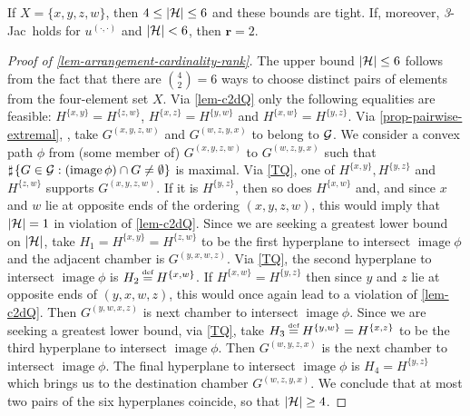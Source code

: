 \documentclass[12pt,a4paper,twoside]{article}
\makeatletter
\newcommand{\srcsize}{\@setfontsize{\srcsize}{3pt}{3pt}}
\newcommand\mdoubleplus{\text{\srcsize$+\mkern-2mu+$}}
\newcommand{\countof}{\mathbin{\sharp}\hskip1pt}
\newcommand{\dd}{{(\cdot,\cdot)}}
\newcommand{\threejac}{\textup{\textit{3}-Jac}}
\DeclareMathOperator{\image}{image}
\makeatother
\begin{document}
\begin{appendices}
\begin{proposition}\label{lem-arrangement-cardinality-rank}
  If $X = \{ x, y , z , w\}$, then $4 \leq \lvert \mathcal H \rvert \leq 6$ and
  these bounds are tight. If, moreover, \threejac\ holds for $u^{\dd}$ and
  $\lvert \mathcal H \rvert < 6 $, then $\mathbf{r} = 2$.
\end{proposition}
\begin{proof}[Proof of \cref{lem-arrangement-cardinality-rank}]
  The upper bound $\lvert \mathcal H \rvert \leq 6$ follows from the fact that there
  are $\binom{4}{2} = 6 $ ways to choose distinct pairs of elements from the
  four-element set $X$.  Via \cref{lem-c2dQ} only the following equalities are
  feasible: $H^{\{x,y\}} = H^{\{z,w\}}$, $H^{\{x,z\}} = H^{\{y,w\}}$ and
  $H^{\{x,w\}} = H^{\{y,z\}}$.  Via \cref{prop-pairwise-extremal}, \withoutlog, take
  $ G^{(x,y,z,w)}$ and $G^{(w,z,y,x)}$ to belong to $\mathcal G$. We consider a
  convex path $\phi$ from (some member of) $G^{(x,y,z,w)}$ to $G^{(w,z,y,x)}$
  such that $\countof \{G \in \mc G: (\image \phi) \cap G \neq \emptyset \} $ is
  maximal. Via \ref{TQ}, one of $H^{\{x,y\}} , H^{\{y,z\}}$ and $H^{\{z,w\}}$
  supports $G^{(x,y,z,w)}$.  If it is $H^{\{y,z\}}$, then so does $H^{\{x,w\}}$
  and, and since $x$ and $w$ lie at opposite ends of the ordering $(x,y,z,w)$,
  this would imply that $\lvert\mathcal H \rvert = 1$ in violation of
  \cref{lem-c2dQ}. Since we are seeking a greatest lower bound on
  $\lvert \mathcal H \rvert$, take $ H_{1} = H^{\{x,y\}} = H^{\{z,w\}}$ to be the
  first hyperplane to intersect $\image \phi$ and the adjacent chamber is
  $G^{(y,x,w,z)}$.  Via \ref{TQ}, the second hyperplane to intersect
  $\image \phi$ is $H_{2} \defeq H^{\{x,w\}}$. If $H^{\{x,w\}} = H^{\{y,z\}}$
  then since $y$ and $z$ lie at opposite ends of $(y,x,w,z)$, this would once
  again lead to a violation of \cref{lem-c2dQ}. Then $G^{(y,w,x,z)}$ is next
  chamber to intersect $\image \phi$. Since we are seeking a greatest lower
  bound, via \ref{TQ}, take $ H_{3} \defeq H^{\{y,w\}} = H^{\{x,z\}}$ to be the
  third hyperplane to intersect $\image \phi$. Then $G^{(w,y,z,x)}$ is the next
  chamber to intersect $\image \phi$. The final hyperplane to intersect
  $\image \phi$ is $H_{4} = H^{\{y,z\}}$ which brings us to the destination
  chamber $G^{(w,z,y,x)}$.  We conclude that at most two pairs of the six
  hyperplanes coincide, so that $\lvert \mathcal H \rvert \geq 4 $.
  

\end{proof}
\end{appendices}
\end{document}
